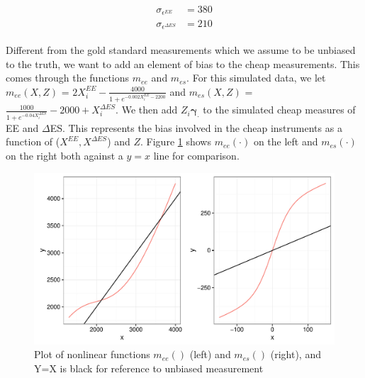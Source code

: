 \documentclass[11pt]{article}\usepackage[]{graphicx}\usepackage[]{color}
\makeatletter
\def\maxwidth{ %
  \ifdim\Gin@nat@width>\linewidth
    \linewidth
  \else
    \Gin@nat@width
  \fi
}
\newenvironment{knitrout}{}{} %
\makeatother
\begin{document}
  
\begin{align}
  \begin{split}
   \label{cheapvar}
   \sigma_{\epsilon^{EE}} &= 380 \\
   \sigma_{\epsilon^{\Delta ES}} &= 210
   \end{split}
\end{align}

  Different from the gold standard measurements which we assume to be unbiased to the truth, we want to add an element of bias to the cheap measurements. This comes through the functions $m_{ee}$ and $m_{es}$. For this simulated data, we let $m_{ee}(X,Z)$ = $2X_i^{EE}-\frac{4000}{1+e^{-0.002X_i^{EE}-2200}} $ and $m_{es}(X,Z)$ = $\frac{1000}{1+e^{-0.04X_i^{\Delta ES}}} - 2000 + X_i^{\Delta ES}$. We then add $Z_i \boldsymbol{\gamma_{\cdot}}$ to the simulated cheap measures of EE and $\Delta$ES. This represents the bias involved in the cheap instruments as a function of ($X^{EE},X^{\Delta ES}$) and $Z$. Figure \ref{fig:nonlinear} shows $m_{ee}(\cdot)$ on the left and $m_{es}(\cdot)$ on the right both against a  $y=x$ line for comparison. 


\begin{knitrout}
\color{fgcolor}\begin{figure}

{\centering \includegraphics[width=\maxwidth]{figure/nonlinear-1} 

}

\caption[Plot of nonlinear functions ]{Plot of nonlinear functions $m_{ee}()$ (left) and $m_{es}()$ (right), and Y=X is black for reference to unbiased measurement}\label{fig:nonlinear}
\end{figure}


\end{knitrout}
\end{document}
